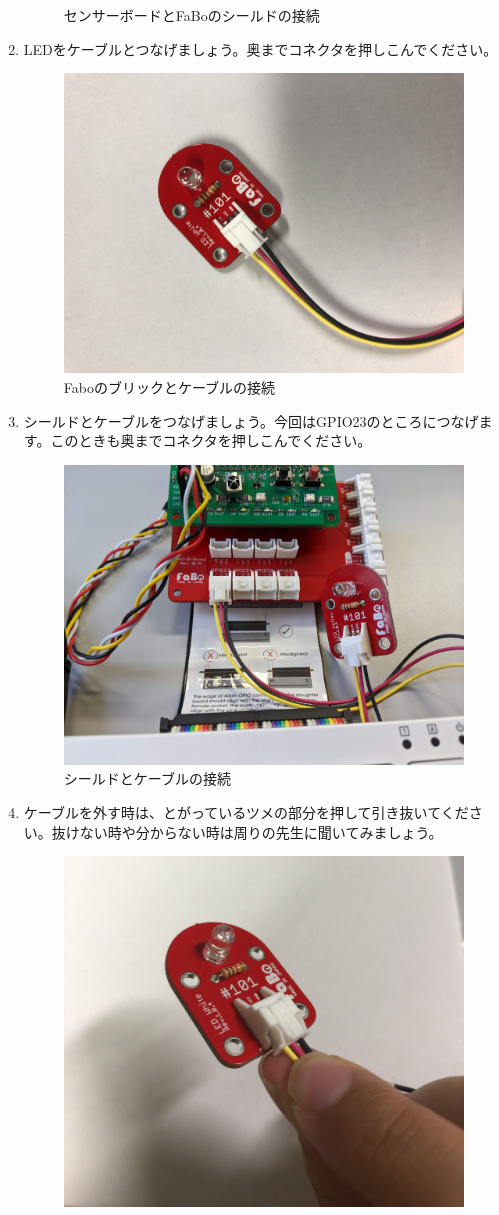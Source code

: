 \begin{enumerate}
\begin{figure}[H]
    \caption{センサーボードとFaBoのシールドの接続}
  \end{figure}
  \item LEDをケーブルとつなげましょう。奥までコネクタを押しこんでください。\\
  \begin{figure}[H]
    \centering
    \includegraphics[width=.4\hsize]{images/chap05/text05-img008.jpg}
    \caption{Faboのブリックとケーブルの接続}
  \end{figure}
  \item シールドとケーブルをつなげましょう。今回はGPIO23のところにつなげます。このときも奥までコネクタを押しこんでください。\\
  \begin{figure}[H]
    \centering
    \includegraphics[width=.4\hsize]{images/chap05/led_brk_on_fabo_with_sb_zoomed.jpg}
    \caption{シールドとケーブルの接続}
  \end{figure}
  \item ケーブルを外す時は、とがっているツメの部分を押して引き抜いてください。抜けない時や分からない時は周りの先生に聞いてみましょう。\\
  \begin{figure}[H]
    \begin{minipage}[t]{0.45\columnwidth}
      \centering
      \includegraphics[width=.8\hsize]{images/chap05/text05-img010.jpg}

\end{minipage}
\end{figure}
\end{enumerate}
